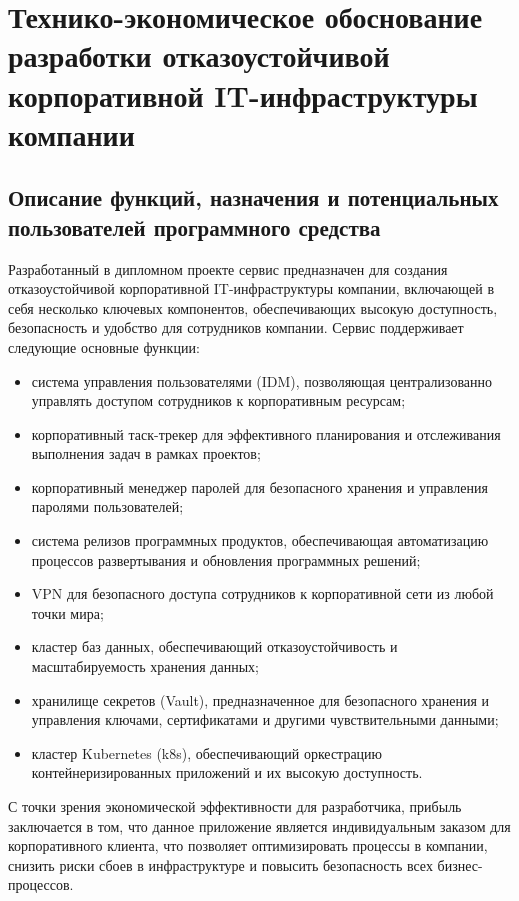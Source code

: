 \setcounter{section}{6}
\section{Технико-экономическое обоснование разработки отказоустойчивой корпоративной IT-инфраструктуры компании}

\subsection{Описание функций, назначения и потенциальных пользователей программного средства}

Разработанный в дипломном проекте сервис предназначен для создания отказоустойчивой корпоративной IT-инфраструктуры компании, включающей в себя несколько ключевых компонентов, обеспечивающих высокую доступность, безопасность и удобство для сотрудников компании. Сервис поддерживает следующие основные функции:

\begin{itemize}
    \item система управления пользователями (IDM), позволяющая централизованно управлять доступом сотрудников к корпоративным ресурсам;
    \item корпоративный таск-трекер для эффективного планирования и отслеживания выполнения задач в рамках проектов;
    \item корпоративный менеджер паролей для безопасного хранения и управления паролями пользователей;
    \item система релизов программных продуктов, обеспечивающая автоматизацию процессов развертывания и обновления программных решений;
    \item VPN для безопасного доступа сотрудников к корпоративной сети из любой точки мира;
    \item кластер баз данных, обеспечивающий отказоустойчивость и масштабируемость хранения данных;
    \item хранилище секретов (Vault), предназначенное для безопасного хранения и управления ключами, сертификатами и другими чувствительными данными;
    \item кластер Kubernetes (k8s), обеспечивающий оркестрацию контейнеризированных приложений и их высокую доступность.
\end{itemize}

С точки зрения экономической эффективности для разработчика, прибыль заключается в том, что данное приложение является индивидуальным заказом для корпоративного клиента, что позволяет оптимизировать процессы в компании, снизить риски сбоев в инфраструктуре и повысить безопасность всех бизнес-процессов.

